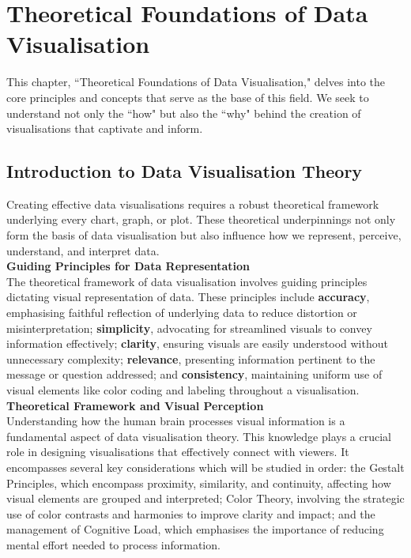 \documentclass{article}\usepackage[]{graphicx}\usepackage[]{xcolor}
\begin{document}
\newpage 


\section{Theoretical Foundations of Data Visualisation}
This chapter, ``Theoretical Foundations of Data Visualisation," delves into the core principles and concepts that serve as the base of this field. We seek to understand not only the ``how" but also the ``why" behind the creation of visualisations that captivate and inform.

\subsection{Introduction to Data Visualisation Theory}
Creating effective data visualisations requires a robust theoretical framework underlying every chart, graph, or plot. These theoretical underpinnings not only form the basis of data visualisation but also influence how we represent, perceive, understand, and interpret data.\\ 

\noindent \textbf{Guiding Principles for Data Representation}\\
The theoretical framework of data visualisation involves guiding principles dictating visual representation of data. These principles include \textbf{accuracy}, emphasising faithful reflection of underlying data to reduce distortion or misinterpretation; \textbf{simplicity}, advocating for streamlined visuals to convey information effectively; \textbf{clarity}, ensuring visuals are easily understood without unnecessary complexity; \textbf{relevance}, presenting information pertinent to the message or question addressed; and \textbf{consistency}, maintaining uniform use of visual elements like color coding and labeling throughout a visualisation.\\

\noindent \textbf{Theoretical Framework and Visual Perception}\\
Understanding how the human brain processes visual information is a fundamental aspect of data visualisation theory. This knowledge plays a crucial role in designing visualisations that effectively connect with viewers. It encompasses several key considerations which will be studied in order: the Gestalt Principles, which encompass proximity, similarity, and continuity, affecting how visual elements are grouped and interpreted; Color Theory, involving the strategic use of color contrasts and harmonies to improve clarity and impact; and the management of Cognitive Load, which emphasises the importance of reducing mental effort needed to process information.
\end{document}
